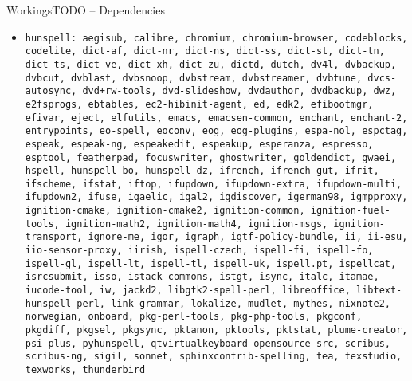 \documentclass{beamer}
\begin{document}
\begin{frame}{WorkingsTODO – Dependencies}
\begin{itemize}
\item \tiny \texttt{\alert{hunspell}: aegisub, calibre, chromium, chromium-browser, codeblocks, codelite, dict-af, dict-nr, dict-ns, dict-ss, dict-st, dict-tn, dict-ts, dict-ve, dict-xh, dict-zu, dictd, dutch, dv4l, dvbackup, dvbcut, dvblast, dvbsnoop, dvbstream, dvbstreamer, dvbtune, dvcs-autosync, dvd+rw-tools, dvd-slideshow, dvdauthor, dvdbackup, dwz, e2fsprogs, ebtables, ec2-hibinit-agent, ed, edk2, efibootmgr, efivar, eject, elfutils, emacs, emacsen-common, enchant, enchant-2, entrypoints, eo-spell, eoconv, eog, eog-plugins, espa-nol, espctag, espeak, espeak-ng, espeakedit, espeakup, esperanza, espresso, esptool, featherpad, focuswriter, ghostwriter, goldendict, gwaei, hspell, hunspell-bo, hunspell-dz, ifrench, ifrench-gut, ifrit, ifscheme, ifstat, iftop, ifupdown, ifupdown-extra, ifupdown-multi, ifupdown2, ifuse, igaelic, igal2, igdiscover, igerman98, igmpproxy, ignition-cmake, ignition-cmake2, ignition-common, ignition-fuel-tools, ignition-math2, ignition-math4, ignition-msgs, ignition-transport, ignore-me, igor, igraph, igtf-policy-bundle, ii, ii-esu, iio-sensor-proxy, iirish, ispell-czech, ispell-fi, ispell-fo, ispell-gl, ispell-lt, ispell-tl, ispell-uk, ispell.pt, ispellcat, isrcsubmit, isso, istack-commons, istgt, isync, italc, itamae, iucode-tool, iw, jackd2, libgtk2-spell-perl, libreoffice, libtext-hunspell-perl, link-grammar, lokalize, mudlet, mythes, nixnote2, norwegian, onboard, pkg-perl-tools, pkg-php-tools, pkgconf, pkgdiff, pkgsel, pkgsync, pktanon, pktools, pktstat, plume-creator, psi-plus, pyhunspell, qtvirtualkeyboard-opensource-src, scribus, scribus-ng, sigil, sonnet, sphinxcontrib-spelling, tea, texstudio, texworks, thunderbird}
\end{itemize}
\end{frame}
\end{document}
